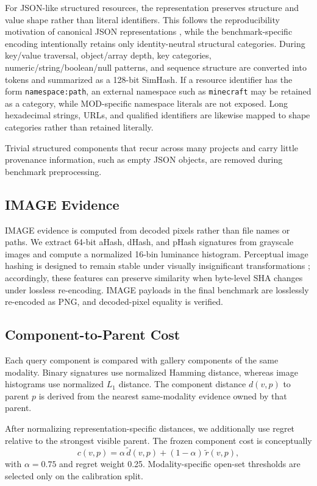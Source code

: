 \documentclass[runningheads]{llncs}
\begin{document}
For JSON-like structured resources, the representation preserves structure and value shape rather than literal identifiers. This follows the reproducibility motivation of canonical JSON representations \cite{rundgren2020jcs}, while the benchmark-specific encoding intentionally retains only identity-neutral structural categories. During key/value traversal, object/array depth, key categories, numeric/string/boolean/null patterns, and sequence structure are converted into tokens and summarized as a 128-bit SimHash. If a resource identifier has the form \texttt{namespace:path}, an external namespace such as \texttt{minecraft} may be retained as a category, while MOD-specific namespace literals are not exposed. Long hexadecimal strings, URLs, and qualified identifiers are likewise mapped to shape categories rather than retained literally.

Trivial structured components that recur across many projects and carry little provenance information, such as empty JSON objects, are removed during benchmark preprocessing.

\subsection{IMAGE Evidence}

IMAGE evidence is computed from decoded pixels rather than file names or paths. We extract 64-bit aHash, dHash, and pHash signatures from grayscale images and compute a normalized 16-bin luminance histogram. Perceptual image hashing is designed to remain stable under visually insignificant transformations \cite{monga2006perceptual}; accordingly, these features can preserve similarity when byte-level SHA changes under lossless re-encoding. IMAGE payloads in the final benchmark are losslessly re-encoded as PNG, and decoded-pixel equality is verified.

\subsection{Component-to-Parent Cost}

Each query component is compared with gallery components of the same modality. Binary signatures use normalized Hamming distance, whereas image histograms use normalized $L_1$ distance. The component distance $d(v,p)$ to parent $p$ is derived from the nearest same-modality evidence owned by that parent.

After normalizing representation-specific distances, we additionally use regret relative to the strongest visible parent. The frozen component cost is conceptually
\[
c(v,p)=\alpha\,\tilde d(v,p)+(1-\alpha)\,\tilde r(v,p),
\]
with $\alpha=0.75$ and regret weight 0.25. Modality-specific open-set thresholds are selected only on the calibration split.
\end{document}
